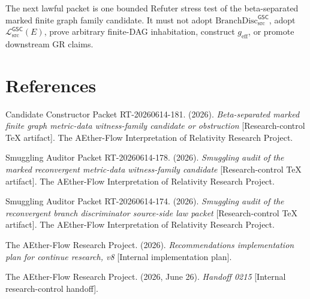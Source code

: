 \documentclass[11pt]{article}
\newcommand{\MetricData}{\mathcal{L}_{\mathrm{src}}^{\mathsf{GSC}}}
\newcommand{\geff}{g_{\mathrm{eff}}}
\newcommand{\BranchDisc}{\mathrm{BranchDisc}_{\mathrm{src}}^{\mathsf{GSC}}}
\begin{document}
The next lawful packet is one bounded Refuter stress test of the
beta-separated marked finite graph family candidate. It must not adopt
\(\BranchDisc\), adopt \(\MetricData(E)\), prove arbitrary finite-DAG
inhabitation, construct \(\geff\), or promote downstream GR claims.

\section*{References}

Candidate Constructor Packet RT-20260614-181. (2026). \textit{Beta-separated
marked finite graph metric-data witness-family candidate or obstruction}
[Research-control TeX artifact]. The AEther-Flow Interpretation of Relativity
Research Project.

Smuggling Auditor Packet RT-20260614-178. (2026). \textit{Smuggling audit of
the marked reconvergent metric-data witness-family candidate}
[Research-control TeX artifact]. The AEther-Flow Interpretation of Relativity
Research Project.

Smuggling Auditor Packet RT-20260614-174. (2026). \textit{Smuggling audit of
the reconvergent branch discriminator source-side law packet}
[Research-control TeX artifact]. The AEther-Flow Interpretation of Relativity
Research Project.

The AEther-Flow Research Project. (2026). \textit{Recommendations
implementation plan for continue research, v8} [Internal implementation
plan].

The AEther-Flow Research Project. (2026, June 26). \textit{Handoff 0215}
[Internal research-control handoff].
\end{document}
